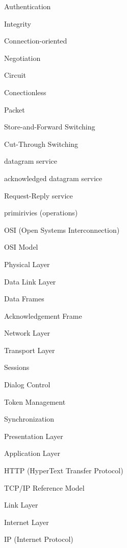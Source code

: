 \filbreak
\vskip 3mm
Authentication

\filbreak
\vskip 3mm
Integrity

\filbreak
\vskip 3mm
Connection-oriented

\filbreak
\vskip 3mm
Negotiation

\filbreak
\vskip 3mm
Circuit

\filbreak
\vskip 3mm
Conectionless

\filbreak
\vskip 3mm
Packet

\filbreak
\vskip 3mm
Store-and-Forward Switching

\filbreak
\vskip 3mm
Cut-Through Switching

\filbreak
\vskip 3mm

\filbreak
\vskip 3mm
datagram service

\filbreak
\vskip 3mm
acknowledged datagram service

\filbreak
\vskip 3mm
Request-Reply service

\filbreak
\vskip 3mm
primirivies (operations)

\filbreak
\vskip 3mm
OSI (Open Systems Interconnection)

\filbreak
\vskip 3mm
OSI Model

\filbreak
\vskip 3mm
Physical Layer

\filbreak
\vskip 3mm
Data Link Layer

\filbreak
\vskip 3mm
Data Frames

\filbreak
\vskip 3mm
Acknowledgement Frame

\filbreak
\vskip 3mm
Network Layer

\filbreak
\vskip 3mm
Transport Layer

\filbreak
\vskip 3mm
Sessions

\filbreak
\vskip 3mm
Dialog Control

\filbreak
\vskip 3mm
Token Management

\filbreak
\vskip 3mm
Synchronization

\filbreak
\vskip 3mm
Presentation Layer

\filbreak
\vskip 3mm
Application Layer

\filbreak
\vskip 3mm
HTTP (HyperText Transfer Protocol)

\filbreak
\vskip 3mm
TCP/IP Reference Model

\filbreak
\vskip 3mm
Link Layer

\filbreak
\vskip 3mm
Internet Layer

\filbreak
\vskip 3mm
IP (Internet Protocol)

